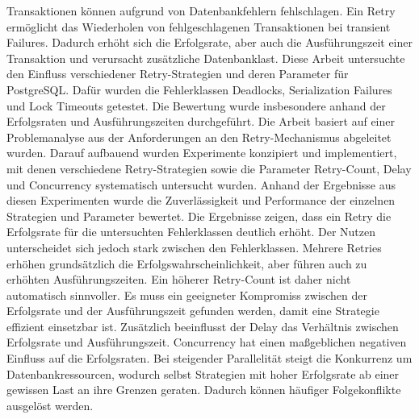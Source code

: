 
Transaktionen können aufgrund von Datenbankfehlern fehlschlagen.
Ein Retry ermöglicht das Wiederholen von fehlgeschlagenen Transaktionen bei transient Failures.
Dadurch erhöht sich die Erfolgsrate, aber auch die Ausführungszeit einer Transaktion und verursacht zusätzliche
Datenbanklast.
Diese Arbeit untersuchte den Einfluss verschiedener Retry-Strategien und deren Parameter für PostgreSQL\@.
Dafür wurden die Fehlerklassen Deadlocks, Serialization Failures und Lock Timeouts getestet.
Die Bewertung wurde insbesondere anhand der Erfolgsraten und Ausführungszeiten durchgeführt.
Die Arbeit basiert auf einer Problemanalyse aus der Anforderungen an den Retry-Mechanismus abgeleitet wurden.
Darauf aufbauend wurden Experimente konzipiert und implementiert, mit denen verschiedene Retry-Strategien sowie die
Parameter Retry-Count, Delay und Concurrency systematisch untersucht wurden.
Anhand der Ergebnisse aus diesen Experimenten wurde die Zuverlässigkeit und Performance der einzelnen Strategien
und Parameter bewertet.
Die Ergebnisse zeigen, dass ein Retry die Erfolgsrate für die untersuchten Fehlerklassen deutlich erhöht.
Der Nutzen unterscheidet sich jedoch stark zwischen den Fehlerklassen.
Mehrere Retries erhöhen grundsätzlich die Erfolgswahrscheinlichkeit, aber führen auch zu erhöhten Ausführungszeiten.
Ein höherer Retry-Count ist daher nicht automatisch sinnvoller.
Es muss ein geeigneter Kompromiss zwischen der Erfolgsrate und der Ausführungszeit gefunden werden, damit eine
Strategie effizient einsetzbar ist.
Zusätzlich beeinflusst der Delay das Verhältnis zwischen Erfolgsrate und Ausführungszeit.
Concurrency hat einen maßgeblichen negativen Einfluss auf die Erfolgsraten.
Bei steigender Parallelität steigt die Konkurrenz um Datenbankressourcen, wodurch selbst Strategien mit hoher
Erfolgsrate ab einer gewissen Last an ihre Grenzen geraten.
Dadurch können häufiger Folgekonflikte ausgelöst werden.

